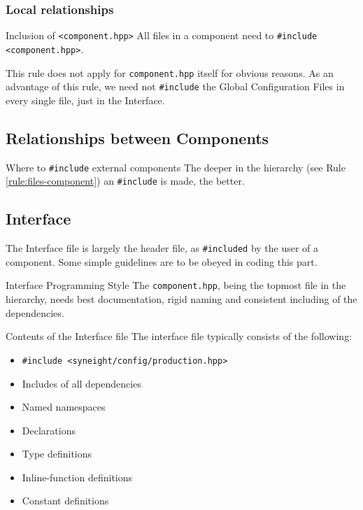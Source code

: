 \subsubsection{Local relationships}

\begin{rule*}{Inclusion of \texttt{<component.hpp>}}
  \label{rule:inclusion-component-hpp}
  All files in a component need to \texttt{\#include <component.hpp>}.
\end{rule*}
%
This rule does not apply for \texttt{component.hpp} itself for obvious reasons.
As an advantage of this rule, we need not \texttt{\#include} the Global
Configuration Files in every single file, just in the Interface.

\subsection{Relationships between Components}

\begin{guideline*}{Where to \texttt {\#include} external components}
  The deeper in the hierarchy (see Rule \ref{rule:files-component})
  an \texttt {\#include} is made, the better.
\end{guideline*}

\subsection{Interface}
\label{sec:interface}

The Interface file is largely the header file, as \texttt{\#included} by the
user of a component.
%
Some simple guidelines are to be obeyed in coding this part.

\begin{guideline*}{Interface Programming Style}
  The {\tt component.hpp}, being the topmost file in the hierarchy,
  needs best documentation, rigid naming and consistent including of the
  dependencies.
\end{guideline*}

\begin{guideline*}{Contents of the Interface file}
  The interface file typically consists of the following:
  \begin{itemize}
    \item{\texttt{\#include <syneight/config/production.hpp>}}
    \item{Includes of all dependencies}
    \item{Named namespaces}
    \item{Declarations}
    \item{Type definitions}
    \item{Inline-function definitions}
    \item{Constant definitions}
  \end{itemize}
\end{guideline*}

